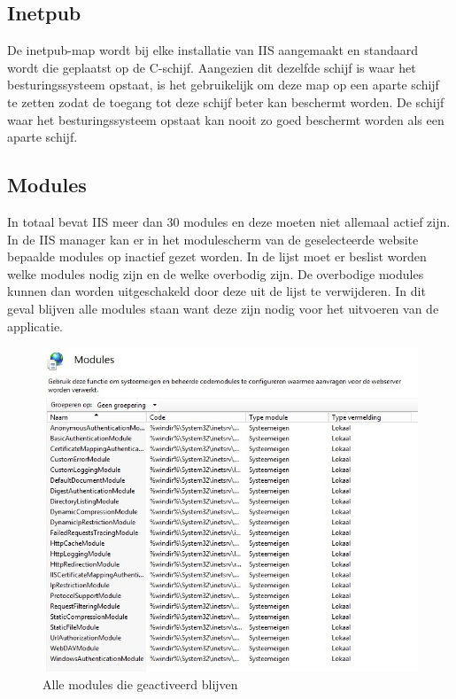 \documentclass[pdftex,a4paper,12pt]{report}
\begin{document}
\subsection{Inetpub}
De inetpub-map wordt bij elke installatie van IIS aangemaakt en standaard wordt die geplaatst op de C-schijf. Aangezien dit dezelfde schijf is waar het besturingssysteem opstaat, is het gebruikelijk om deze map op een aparte schijf te zetten zodat de toegang tot deze schijf beter kan beschermt worden. De schijf waar het besturingssysteem opstaat kan nooit zo goed beschermt worden als een aparte schijf. \citep{Darmanin2014}

\subsection{Modules}
In totaal bevat IIS meer dan 30 modules en deze moeten niet allemaal actief zijn. In de IIS manager kan er in het modulescherm van de geselecteerde website bepaalde modules op inactief gezet worden. In de lijst moet er beslist worden welke modules nodig zijn en de welke overbodig zijn. De overbodige modules kunnen dan worden uitgeschakeld door deze uit de lijst te verwijderen. In dit geval blijven alle modules staan want deze zijn nodig voor het uitvoeren van de applicatie. \citep{Darmanin2014} \citep{Microsoft2013}

\begin{figure}[H]
\begin{center}
\includegraphics[scale=0.60]{img/IIS_Modules}
\end{center}
\caption{Alle modules die geactiveerd blijven}
\label{img:IISModules}
\end{figure}
\end{document}
